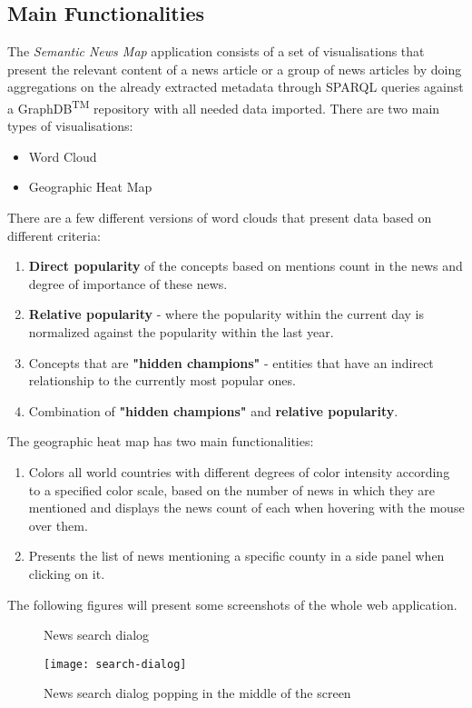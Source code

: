 \subsection{Main Functionalities}
The \textit{Semantic News Map} application consists of a set of visualisations that present the relevant content of a news article or a group of news articles by doing aggregations on the already extracted metadata through SPARQL queries against a GraphDB\textsuperscript{TM} repository with all needed data imported. There are two main types of visualisations: 
\begin{itemize}
    \item Word Cloud
    \item Geographic Heat Map
\end{itemize}
There are a few different versions of word clouds that present data based on different criteria:
\begin{enumerate}
    \item \textbf{Direct popularity} of the concepts based on mentions count in the news and degree of importance of these news.
    \item \textbf{Relative popularity} - where the popularity within the current day is normalized against the popularity within the last year.
    \item Concepts that are \textbf{"hidden champions"} - entities that have an indirect relationship to the currently most popular ones.
    \item Combination of \textbf{"hidden champions"} and \textbf{relative popularity}. 
\end{enumerate}
The geographic heat map has two main functionalities:
\begin{enumerate}
    \item Colors all world countries with different degrees of color intensity according to a specified color scale, based on the number of news in which they are mentioned and displays the news count of each when hovering with the mouse over them.
    \item Presents the list of news mentioning a specific county in a side panel when clicking on it.
\end{enumerate}

The following figures will present some screenshots of the whole web application.
\begin{figure*}[ht!]
    \centering
    \caption{News search dialog}
    \label{fig:search-dialog-close}
\end{figure*}
\newpage
\begin{figure*}[ht!]
    \centering
    \texttt{[image: search-dialog]}
    \caption{News search dialog popping in the middle of the screen}
    \label{fig:search-dialog}
\end{figure*}

